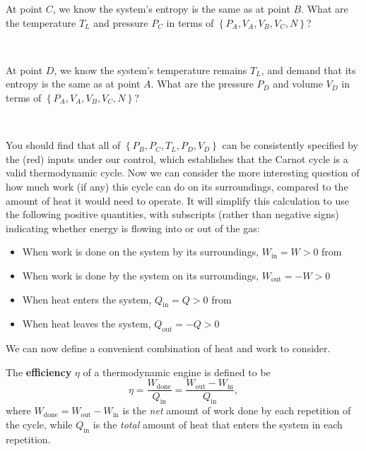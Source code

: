 \newpage %
At point $C$, we know the system's entropy is the same as at point $B$.
What are the temperature $T_L$ and pressure $P_C$ in terms of $\left\{P_A, V_A, V_B, V_C, N\right\}$?
\begin{mdframed}
  \ \\[100 pt]
\end{mdframed}

At point $D$, we know the system's temperature remains $T_L$, and demand that its entropy is the same as at point $A$.
What are the pressure $P_D$ and volume $V_D$ in terms of $\left\{P_A, V_A, V_B, V_C, N\right\}$?
\begin{mdframed}
  \ \\[100 pt]
\end{mdframed}

You should find that all of $\left\{P_B, P_C, T_L, P_D, V_D\right\}$ can be consistently specified by the (red) inputs under our control, which establishes that the Carnot cycle is a valid thermodynamic cycle.
Now we can consider the more interesting question of how much work (if any) this cycle can do on its surroundings, compared to the amount of heat it would need to operate.
It will simplify this calculation to use the following positive quantities, with subscripts (rather than negative signs) indicating whether energy is flowing into or out of the gas: \\[-24 pt]
\begin{itemize}
  \item When work is done on the system by its surroundings, $W_{\text{in}} = W > 0$ from 
  \item When work is done by the system on its surroundings, $W_{\text{out}} = -W > 0$
  \item When heat enters the system, $Q_{\text{in}} = Q > 0$ from 
  \item When heat leaves the system, $Q_{\text{out}} = -Q > 0$
\end{itemize}
We can now define a convenient combination of heat and work to consider.

\begin{shaded}
  The \textbf{efficiency} $\eta$ of a thermodynamic engine is defined to be
  \begin{equation}
    \label{eq:efficiency}
    \eta = \frac{W_{\text{done}}}{Q_{\text{in}}} = \frac{W_{\text{out}} - W_{\text{in}}}{Q_{\text{in}}},
  \end{equation}
  where $W_{\text{done}} = W_{\text{out}} - W_{\text{in}}$ is the \textit{net} amount of work done by each repetition of the cycle, while $Q_{\text{in}}$ is the \textit{total} amount of heat that enters the system in each repetition.
\end{shaded}

